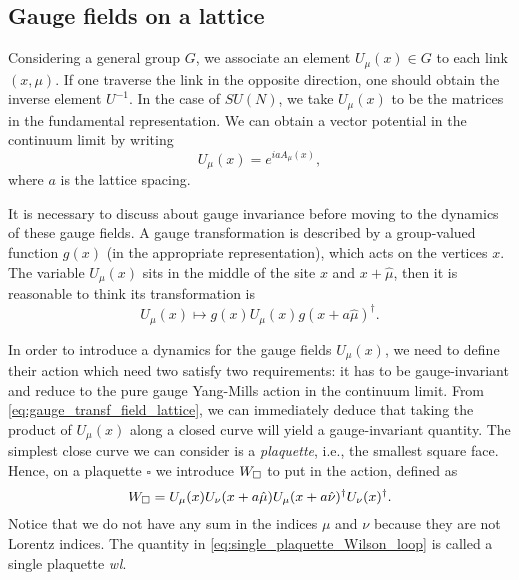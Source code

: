 %
%
\subsection{Gauge fields on a lattice}
\label{sub:gauge_fields_on_a_lattice}

Considering a general group $G$, we associate an element $U_{\mu}(x) \in G$ to each link $(x, \mu)$.
If one traverse the link in the opposite direction, one should obtain the inverse element $U^{-1}$.
In the case of $SU(N)$, we take $U_{\mu}(x)$ to be the matrices in the fundamental representation.
We can obtain a vector potential in the continuum limit by writing
\begin{equation}
    U_{\mu}(x) = e^{i a A_{\mu}(x)},
\end{equation}
where $a$ is the lattice spacing.

It is necessary to discuss about gauge invariance before moving to the dynamics of these gauge fields.
A gauge transformation is described by a group-valued function $g(x)$ (in the appropriate representation), which acts on the vertices $x$.
The variable $U_{\mu}(x)$ sits in the middle of the site $x$ and $x + \hat{\mu}$, then it is reasonable to think its transformation is
\begin{equation}
    U_{\mu}(x) \mapsto g(x) U_{\mu}(x) g(x + a \hat{\mu})^{\dagger}
    \label{eq:gauge_transf_field_lattice}.
\end{equation}

In order to introduce a dynamics for the gauge fields $U_{\mu}(x)$, we need to define their action which need two satisfy two requirements:
it has to be gauge-invariant and reduce to the pure gauge Yang-Mills action in the continuum limit.
From \eqref{eq:gauge_transf_field_lattice}, we can immediately deduce that taking the product of $U_{\mu}(x)$ along a closed curve will yield a gauge-invariant quantity.
The simplest close curve we can consider is a \emph{plaquette}, i.e., the smallest square face.
Hence, on a plaquette $\square$ we introduce $W_{\square}$ to put in the action, defined as
\begin{equation}
    W_{\square} =
    U_{\mu}(x) U_{\nu}(x + a \hat{\mu}) U_{\mu}(x + a \hat{\nu})^{\dagger} U_{\nu}(x)^{\dagger}.
    \label{eq:single_plaquette_Wilson_loop}
\end{equation}
Notice that we do not have any sum in the indices $\mu$ and $\nu$ because they are not Lorentz indices.
The quantity in \eqref{eq:single_plaquette_Wilson_loop} is called a single plaquette \emph{\ac{wl}}.


